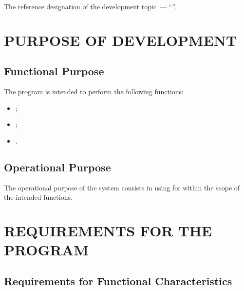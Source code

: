 \documentclass[12pt,a4paper]{extarticle}
\begin{document}
The reference designation of the development topic~--- \enquote{}.

\clearpage

\section{PURPOSE OF DEVELOPMENT}

\subsection{Functional Purpose}

The program is intended to perform the following functions:
\begin{itemize}[nosep, leftmargin=1.25cm]
    \item {};
    \item {};
    \item {}.
\end{itemize}

\subsection{Operational Purpose}

The operational purpose of the system consists in using  for  within the scope of the intended functions.

\clearpage

\section{REQUIREMENTS FOR THE PROGRAM}

\subsection{Requirements for Functional Characteristics}
\label{sec:functional_reqs}
\end{document}
